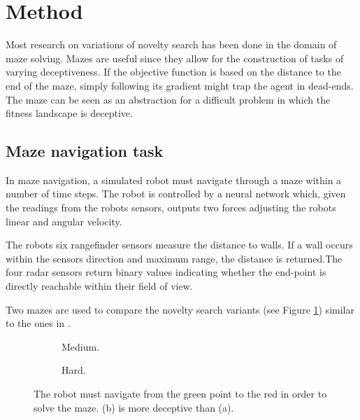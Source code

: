 \section{Method}
Most research on variations of novelty search has been done in the domain of maze solving. Mazes are useful
since they allow for the construction of tasks of varying deceptiveness. If the objective function is
based on the distance to the end of the maze, simply following its gradient might trap the agent in
dead-ends. The maze can be seen as an abstraction for a difficult problem in which the fitness
landscape is deceptive.

\subsection{Maze navigation task}
In maze navigation, a simulated robot must navigate through a maze within a number of time steps.
The robot is controlled by a neural network which, given the readings from the robots sensors,
outputs two forces adjusting the robots linear and angular velocity.

The robots six rangefinder sensors measure the distance to walls. If a wall occurs within the sensors
direction and maximum range, the distance is returned.The four radar sensors return binary
values indicating whether the end-point is directly reachable within their field of view.

Two mazes are used to compare the novelty search variants (see Figure \ref{mazes}) similar to the ones in \cite{novelty_alone}.

\begin{figure}[H]
    \captionsetup[subfigure]{justification=centering}
    \centering
    \begin{mdframed}
        \begin{subfigure}[b]{0.45\textwidth}
            \centering
            \hspace*{2em}\scalebox{0.3}{}
            \caption{Medium.}
        \end{subfigure}
        \begin{subfigure}[b]{0.5\textwidth}
            \centering
            \hspace*{5em}\scalebox{0.3}{}
            \caption{Hard.}
        \end{subfigure}
    \end{mdframed}
    \caption{The robot must navigate from the green point to the red in order to solve the maze.
             (b) is more deceptive than (a).}
    \label{mazes}
\end{figure}

